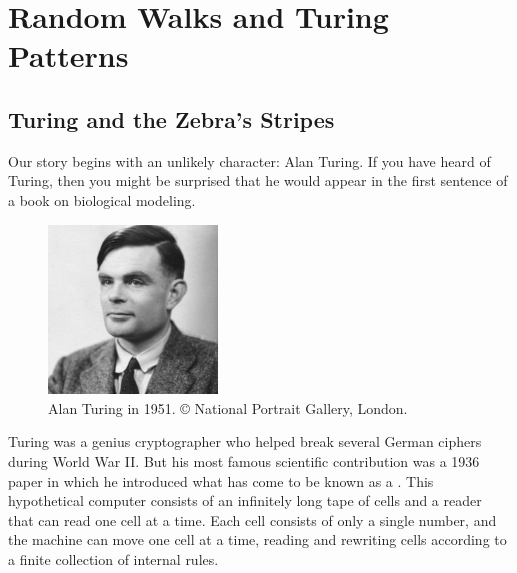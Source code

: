\chapter[Random Walks and Turing Patterns]{Random Walks and Turing Patterns}
\label{chapter:turing}
\renewcommand{\chaptertitle}{Finding Motifs in Transcription Factor Networks}


\FloatBarrier

\section{Turing and the Zebra’s Stripes}
\label{sec:introduction}

Our story begins with an unlikely character: Alan Turing. If you have heard of Turing, then you might be surprised that he would appear in the first sentence of a book on biological modeling.\\

\begin{figure}[h]
\centering
\mySfFamily
\includegraphics[width = 0.4\textwidth]{../images/alan_turing_npg_cc.jpg}
\caption{Alan Turing in 1951. © National Portrait Gallery, London.}
\label{fig:alan_turing_npg_cc}
\end{figure}

Turing was a genius cryptographer who helped break several German ciphers during World War II. But his most famous scientific contribution was a 1936 paper in which he introduced what has come to be known as a . This hypothetical computer consists of an infinitely long tape of cells and a reader that can read one cell at a time. Each cell consists of only a single number, and the machine can move one cell at a time, reading and rewriting cells according to a finite collection of internal rules.

